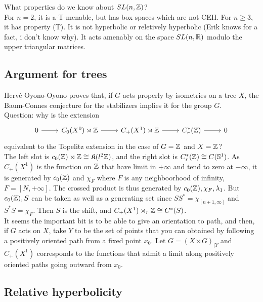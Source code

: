 What properties do we know about $SL(n,\mathbb Z)$?\\

For $n=2$, it is a-T-menable, but has box spaces which are not CEH. For $n\geq 3$, it has property (T). It is not hyperbolic or reletively hyperbolic (Erik knows for a fact, i don't know why). It acts amenably on the space $SL(n,\mathbb R)$ modulo the upper triangular matrices. 

\subsection{Argument for trees}

Herv\'e Oyono-Oyono proves that, if $G$ acts properly by isometries on a tree $X$, the Baum-Connes conjecture for the stabilizers implies it for the group $G$.\\

Question: why is the extension 
\[\begin{tikzcd} 0 \arrow{r} & C_0(X^0)\rtimes \Z \arrow{r}& C_+(X^1)\rtimes \Z \arrow{r} & C^*_r(\Z) \arrow{r}& 0 \end{tikzcd}\]
equivalent to the Topelitz extension in the case of $G=\mathbb Z$ and $X = \mathbb Z$?\\

The left slot is $c_0(\mathbb Z)\rtimes \mathbb Z \cong \mathfrak K(l^2\mathbb Z)$, and the right slot is $C^*_r(\mathbb Z)\cong C(\mathbb S^1)$. As $C_+(X^1)$ is the function on $\mathbb Z$ that have limit in $+\infty$ and tend to zero at $-\infty$, it is generated by $c_0(\mathbb Z)$ and $\chi_F$ where $F$ is any neighboorhood of infinity, $F=[N,+\infty]$. The crossed product is thus generated by $c_0(\mathbb Z), \chi_F, \lambda_1$. But $c_0(\mathbb Z), S$ can be taken as well as a generating set since $SS^* = \chi_{[n+1,\infty]}$ and $S^*S =\chi_F$. Then $S$ is the shift, and $C_+(X^1)\rtimes_r \mathbb Z\cong C^*(S)$.\\

It seems the important bit is to be able to give an orientation to path, and then, if $G$ acts on $X$, take $Y$ to be the set of points that you can obtained by following a positively oriented path from a fixed point $x_0$. Let $G= (X\rtimes G)_{|Y}$ and $C_+(X^1)$ corresponds to the functions that admit a limit along positively oriented paths going outward from $x_0$.\\ 

\subsection{Relative hyperbolicity}

